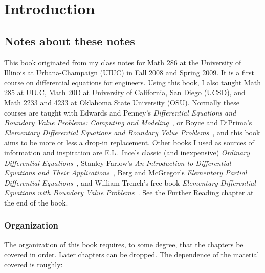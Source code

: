 \chapter*{Introduction} \label{intro:chapter}


\section{Notes about these notes}
\label{notes:section}



This book originated from my class notes for Math 286
at the \href{https://www.math.uiuc.edu/}{University of Illinois at
Urbana-Champaign} (UIUC)
in Fall 2008 and
Spring 2009.
It is a first course on differential equations for engineers.
Using this book, I also taught Math 285 at UIUC\@,
Math 20D at
\href{https://www.math.ucsd.edu/}{University of California, San Diego} (UCSD),
and Math 2233 and 4233 at
\href{https://math.okstate.edu/}{Oklahoma State University} (OSU).
Normally these courses are taught with
Edwards and Penney's \emph{Differential
Equations and Boundary Value Problems: Computing and Modeling}~\cite{EP}, or
Boyce and DiPrima's
\emph{Elementary
Differential Equations and Boundary Value Problems}~\cite{BD},
and this book aims to be more or less a drop-in replacement.
Other books I used as sources of information and inspiration
are E.L.\ Ince's classic (and inexpensive)
\emph{Ordinary Differential Equations}~\cite{I},
Stanley Farlow's \emph{An Introduction to Differential Equations and Their
Applications}~\cite{F},
Berg and McGregor's
\emph{Elementary Partial Differential Equations}~\cite{BM},
and William Trench's free book
\emph{Elementary
Differential Equations with Boundary Value Problems}~\cite{T}.
See the \hyperref[furtherreading:chapter]{Further Reading} chapter at the end of the book.

\subsection{Organization}

The organization of this book requires, to some degree,
that the chapters be covered in order.
Later chapters can be dropped.
The dependence of the material covered is roughly:

